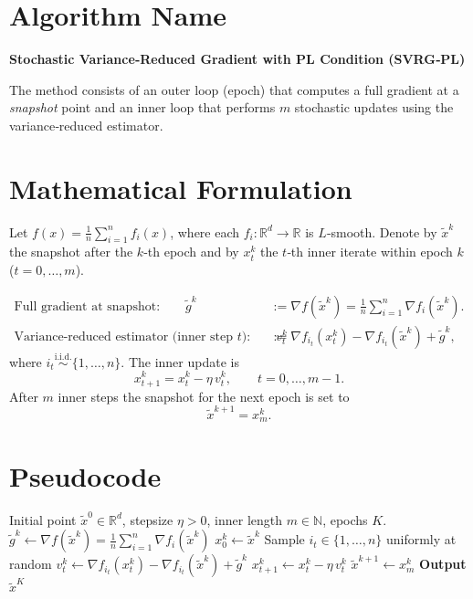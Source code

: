 \documentclass{article}
\begin{document}
\section*{Algorithm Name}
\textbf{Stochastic Variance‑Reduced Gradient with PL Condition (SVRG‑PL)}  

The method consists of an outer loop (epoch) that computes a full gradient at a \emph{snapshot} point
and an inner loop that performs $m$ stochastic updates using the variance‑reduced estimator.

\section*{Mathematical Formulation}
Let $f(x)=\frac1n\sum_{i=1}^{n}f_i(x)$, where each $f_i:\mathbb{R}^{d}\rightarrow\mathbb{R}$ is $L$‑smooth.
Denote by $\tilde{x}^{k}$ the snapshot after the $k$‑th epoch and by $x_t^{k}$ the $t$‑th inner iterate
within epoch $k$ ($t=0,\dots,m$).  

\[
\begin{aligned}
\text{Full gradient at snapshot:}\qquad 
\tilde{g}^{k}&:=\nabla f(\tilde{x}^{k})=\frac1n\sum_{i=1}^{n}\nabla f_i(\tilde{x}^{k}) .\\[4pt]
\text{Variance‑reduced estimator (inner step $t$):}\qquad 
v_t^{k}&:=\nabla f_{i_t}(x_t^{k})-\nabla f_{i_t}(\tilde{x}^{k})+\tilde{g}^{k},
\end{aligned}
\]
where $i_t\stackrel{\text{i.i.d.}}{\sim}\{1,\dots,n\}$.
The inner update is
\[
x_{t+1}^{k}=x_{t}^{k}-\eta\,v_{t}^{k},\qquad t=0,\dots,m-1 .
\]
After $m$ inner steps the snapshot for the next epoch is set to
\[
\tilde{x}^{k+1}=x_{m}^{k}.
\]

\section*{Pseudocode}
\begin{algorithm}[H]
\caption{SVRG‑PL}
\begin{algorithmic}[1]
\Require Initial point $\tilde{x}^{0}\in\mathbb{R}^{d}$, stepsize $\eta>0$, inner length $m\in\mathbb{N}$, epochs $K$.
    \State $\tilde{g}^{k}\gets \nabla f(\tilde{x}^{k})=\frac1n\sum_{i=1}^{n}\nabla f_i(\tilde{x}^{k})$
    \State $x^{k}_{0}\gets \tilde{x}^{k}$
        \State Sample $i_t\in\{1,\dots,n\}$ uniformly at random
        \State $v^{k}_{t}\gets \nabla f_{i_t}(x^{k}_{t})-\nabla f_{i_t}(\tilde{x}^{k})+\tilde{g}^{k}$
        \State $x^{k}_{t+1}\gets x^{k}_{t}-\eta\,v^{k}_{t}$
    \EndFor
    \State $\tilde{x}^{k+1}\gets x^{k}_{m}$
\EndFor
\State \textbf{Output} $\tilde{x}^{K}$
\end{algorithmic}
\end{algorithm}
\end{document}
